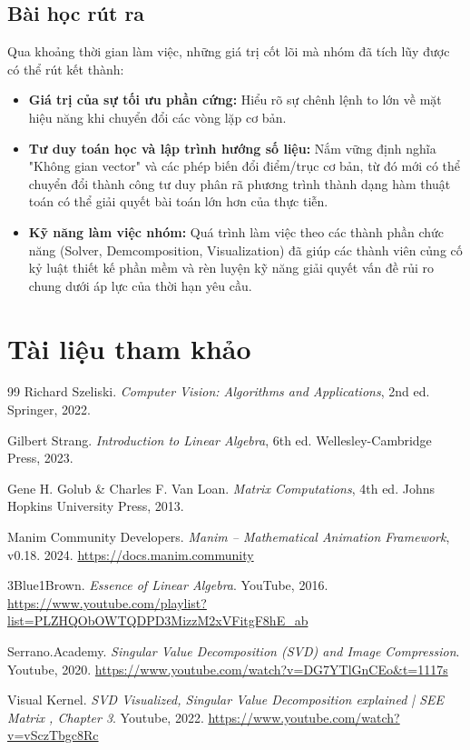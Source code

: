 \documentclass[a4paper]{article}
\begin{document}
\subsection{Bài học rút ra}
Qua khoảng thời gian làm việc, những giá trị cốt lõi mà nhóm đã tích lũy được có thể rút kết thành:
\begin{itemize}
    \item \textbf{Giá trị của sự tối ưu phần cứng:} Hiểu rõ sự chênh lệnh to lớn về mặt hiệu năng khi chuyển đổi các vòng lặp cơ bản.
    \item \textbf{Tư duy toán học và lập trình hướng số liệu:} Nắm vững định nghĩa "Không gian vector" và các phép biến đổi điểm/trục cơ bản, từ đó mới có thể chuyển đổi thành công tư duy phân rã phương trình thành dạng hàm thuật toán có thể giải quyết bài toán lớn hơn của thực tiễn.
    \item \textbf{Kỹ năng làm việc nhóm:} Quá trình làm việc theo các thành phần chức năng (Solver, Demcomposition, Visualization) đã giúp các thành viên củng cố kỷ luật thiết kế phần mềm và rèn luyện kỹ năng giải quyết vấn đề rủi ro chung dưới áp lực của thời hạn yêu cầu.
\end{itemize}

\section{Tài liệu tham khảo}
\newpage
\begin{thebibliography}{99}
Richard Szeliski. \textit{Computer Vision: Algorithms and Applications}, 2nd ed. Springer, 2022.

Gilbert Strang. \textit{Introduction to Linear Algebra}, 6th ed. Wellesley-Cambridge Press, 2023.

Gene H. Golub \& Charles F. Van Loan. \textit{Matrix Computations}, 4th ed. Johns Hopkins University Press, 2013.

Manim Community Developers. \textit{Manim – Mathematical Animation Framework}, v0.18. 2024. \url{https://docs.manim.community}

3Blue1Brown. \textit{Essence of Linear Algebra}. YouTube, 2016. \url{https://www.youtube.com/playlist?list=PLZHQObOWTQDPD3MizzM2xVFitgF8hE_ab}

Serrano.Academy. \textit{Singular Value Decomposition (SVD) and Image Compression}. Youtube, 2020. \url{https://www.youtube.com/watch?v=DG7YTlGnCEo&t=1117s}

Visual Kernel. \textit{SVD Visualized, Singular Value Decomposition explained | SEE Matrix , Chapter 3}. Youtube, 2022. \url{https://www.youtube.com/watch?v=vSczTbgc8Rc}
\end{thebibliography}
\end{document}
